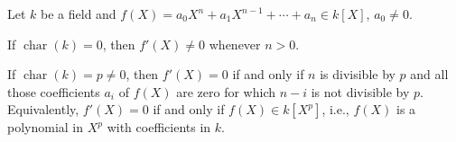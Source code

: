 Let $k$ be a field and $f(X) = a_0 X^n + a_1 X^{n-1} + \cdots + a_n \in k[X]$, $a_0 \neq 0$.

If $\operatorname{char}(k) = 0$, then $f'(X) \neq 0$ whenever $n > 0$.

If $\operatorname{char}(k) = p \neq 0$, then $f'(X) = 0$ if and only if $n$ is divisible by $p$ and all those coefficients $a_i$ of $f(X)$ are zero for which $n-i$ is not divisible by $p$. Equivalently, $f'(X) = 0$ if and only if $f(X) \in k[X^p]$, i.e., $f(X)$ is a polynomial in $X^p$ with coefficients in $k$.
